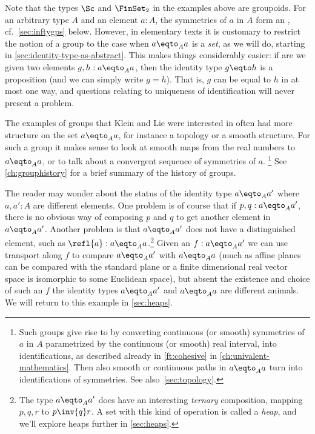 Note that the types $\Sc$ and $\FinSet_2$ in the examples above are groupoids.
For an arbitrary type $A$ and an element $a:A$,
the symmetries of $a$ in $A$ form an \inftygp, cf.~\cref{sec:inftygps} below.
However, in elementary texts it is customary to restrict the notion 
of a group to the case when $a\eqto_A a$ is a \emph{set}, 
as we will do, starting in \cref{sec:identity-type-as-abstract}.
This makes things considerably easier: if are we given two elements 
$g,h:a\eqto_A a$, then the identity type $g\eqto h$ is a proposition
(and we can simply write $g = h$). That is, $g$ can be equal to $h$ in 
at most one way, and questions relating to uniqueness of
identification will never present a problem.

The examples of groups that Klein and Lie were interested in
often had more structure on the set $a\eqto_A a$,
for instance a topology or a smooth structure.
For such a group it makes sense to look at smooth maps from the real numbers
to $a\eqto_A a$, or to talk about a convergent sequence of symmetries of $a$.
\footnote{%
  Such groups give rise to \inftygps by converting
  continuous (or smooth) symmetries of $a$ in $A$
  parametrized by the continuous (or smooth) real interval,
  into identifications,
  as described already in \cref{ft:cohesive}
  in \cref{ch:univalent-mathematics}.
  Then also smooth or continuous paths in $a\eqto_A a$
  turn into identifications of symmetries.
  See also~\cref{sec:topology}.}
See \cref{ch:grouphistory} for a brief summary of the history of groups.

\begin{remark}\label{rem:heap-preview}
  The reader may wonder about the status of the identity type 
  $a\eqto_A a'$ where $a,a':A$ are different elements.
  One problem is of course that if $p,q:a\eqto_A a'$,
  there is no obvious way of composing $p$ and $q$
  to get another element in $a\eqto_A a'$.
  Another problem is that $a\eqto_A a'$ does not have a distinguished element,
  such as $\refl{a}:a\eqto_A a$.\footnote{%
    The type $a\eqto_A a'$ does have an interesting \emph{ternary}
    composition, mapping $p,q,r$ to $p\inv{q}r$.
    A set with this kind of operation is called a \emph{heap},
    and we'll explore heaps further in \cref{sec:heaps}.}
Given an $f:a\eqto_A a'$ we can use transport along $f$ to compare 
$a\eqto_A a'$ with $a\eqto_A a$ (much as affine planes can be compared 
with the standard plane or a finite dimensional real vector space is 
isomorphic to some Euclidean space), but absent the existence and choice 
of such an $f$ the identity types $a\eqto_Aa'$ and $a\eqto_Aa$ are 
different animals.
We will return to this example in \cref{sec:heaps}.
\end{remark}


